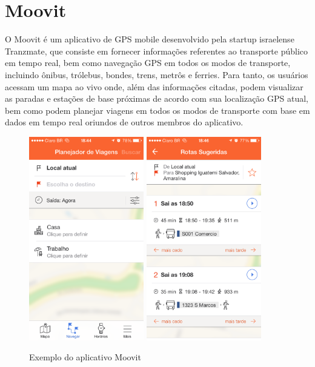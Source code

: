 \section{Moovit}

O Moovit é um aplicativo de GPS mobile desenvolvido pela startup israelense Tranzmate, que consiste em fornecer informações referentes ao transporte público em tempo real, bem como navegação GPS em todos os modos de transporte, incluindo ônibus, trólebus, bondes, trens, metrôs e ferries. Para tanto, os usuários acessam um mapa ao vivo onde, além das informações citadas,  podem visualizar as paradas e estações de base próximas de acordo com sua localização GPS atual, bem como podem planejar viagens em todos os modos de transporte com base em dados em tempo real oriundos de outros membros do aplicativo.
	
\begin{figure}[htp]
\begin{center}
  \includegraphics[width=5cm]{images/moovit1.png}
    \includegraphics[width=5cm]{images/moovit2.png}
  \caption{Exemplo do aplicativo Moovit}
  \label{fig:exampleMoovit}
\end{center}
\end{figure}

